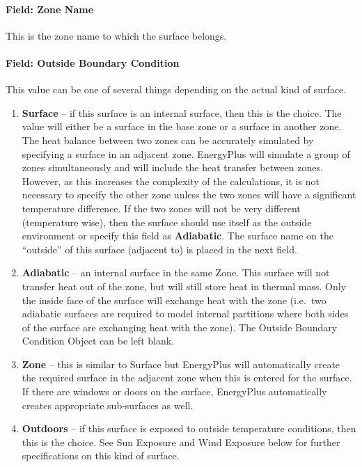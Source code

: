 \paragraph{Field: Zone Name}\label{field-zone-name-10-000}

This is the zone name to which the surface belongs.

\paragraph{Field: Outside Boundary Condition}\label{field-outside-boundary-condition}

This value can be one of several things depending on the actual kind of surface.

\begin{enumerate}
  \item
    \textbf{Surface} -- if this surface is an internal surface, then this is the choice. The value will either be a surface in the base zone or a surface in another zone. The heat balance between two zones can be accurately simulated by specifying a surface in an adjacent zone. EnergyPlus will simulate a group of zones simultaneously and will include the heat transfer between zones. However, as this increases the complexity of the calculations, it is not necessary to specify the other zone unless the two zones will have a significant temperature difference. If the two zones will not be very different (temperature wise), then the surface should use itself as the outside environment or specify this field as \textbf{Adiabatic}. The surface name on the ``outside'' of this surface (adjacent to) is placed in the next field.
  \item
    \textbf{Adiabatic} -- an internal surface in the same Zone. This surface will not transfer heat out of the zone, but will still store heat in thermal mass. Only the inside face of the surface will exchange heat with the zone (i.e.~two adiabatic surfaces are required to model internal partitions where both sides of the surface are exchanging heat with the zone). The Outside Boundary Condition Object can be left blank.
  \item
    \textbf{Zone} -- this is similar to Surface but EnergyPlus will automatically create the required surface in the adjacent zone when this is entered for the surface. If there are windows or doors on the surface, EnergyPlus automatically creates appropriate sub-surfaces as well.
  \item
    \textbf{Outdoors} -- if this surface is exposed to outside temperature conditions, then this is the choice. See Sun Exposure and Wind Exposure below for further specifications on this kind of surface.

\end{enumerate}
